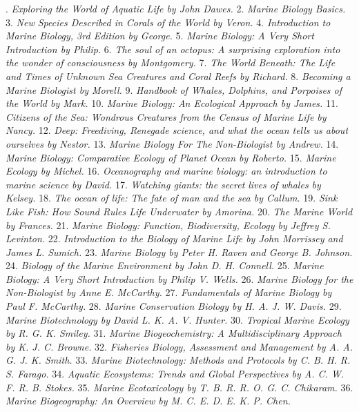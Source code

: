 . \textit{Exploring the World of Aquatic Life by John Dawes.}
2. \textit{Marine Biology Basics.}
3. \textit{New Species Described in Corals of the World by Veron.}
4. \textit{Introduction to Marine Biology, 3rd Edition by George.}
5. \textit{Marine Biology: A Very Short Introduction by Philip.}
6. \textit{The soul of an octopus: A surprising exploration into the wonder of consciousness by Montgomery.}
7. \textit{The World Beneath: The Life and Times of Unknown Sea Creatures and Coral Reefs by Richard.}
8. \textit{Becoming a Marine Biologist by Morell.}
9. \textit{Handbook of Whales, Dolphins, and Porpoises of the World by Mark.}
10. \textit{Marine Biology: An Ecological Approach by James.}
11. \textit{Citizens of the Sea: Wondrous Creatures from the Census of Marine Life by Nancy.}
12. \textit{Deep: Freediving, Renegade science, and what the ocean tells us about ourselves by Nestor.}
13. \textit{Marine Biology For The Non-Biologist by Andrew.}
14. \textit{Marine Biology: Comparative Ecology of Planet Ocean by Roberto.}
15. \textit{Marine Ecology by Michel.}
16. \textit{Oceanography and marine biology: an introduction to marine science by David.}
17. \textit{Watching giants: the secret lives of whales by Kelsey.}
18. \textit{The ocean of life: The fate of man and the sea by Callum.}
19. \textit{Sink Like Fish: How Sound Rules Life Underwater by Amorina.}
20. \textit{The Marine World by Frances.}
21.	\textit{Marine Biology: Function, Biodiversity, Ecology by Jeffrey S. Levinton.}
22.	\textit{Introduction to the Biology of Marine Life by John Morrissey and James L. Sumich.}
23.	\textit{Marine Biology by Peter H. Raven and George B. Johnson.}
24.	\textit{Biology of the Marine Environment by John D. H. Connell.}
25.	\textit{Marine Biology: A Very Short Introduction by Philip V. Wells.}
26.	\textit{Marine Biology for the Non-Biologist by Anne E. McCarthy.}
27.	\textit{Fundamentals of Marine Biology by Paul F. McCarthy.}
28.	\textit{Marine Conservation Biology by H. A. J. W. Davis.}
29.	\textit{Marine Biotechnology by David L. K. A. V. Hunter.}
30.	\textit{Tropical Marine Ecology by R. G. K. Smiley.}
31.	\textit{Marine Biogeochemistry: A Multidisciplinary Approach by K. J. C. Browne.}
32.	\textit{Fisheries Biology, Assessment and Management by A. A. G. J. K. Smith.}
33.	\textit{Marine Biotechnology: Methods and Protocols by C. B. H. R. S. Farago.}
34.	\textit{Aquatic Ecosystems: Trends and Global Perspectives by A. C. W. F. R. B. Stokes.}
35.	\textit{Marine Ecotoxicology by T. B. R. R. O. G. C. Chikaram.}
36.	\textit{Marine Biogeography: An Overview by M. C. E. D. E. K. P. Chen.}
